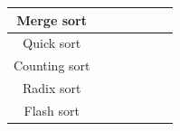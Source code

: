 \begin{table}[!h]
{\begin{tabular}{|c|c|c|c|c|c|c|}
    Merge sort                 &                 &               &                &               &               &                 \\ \hline
    Quick sort                 &                 &               &                &               &               &                 \\ \hline
    Counting sort              &                 &               &                &               &               &                 \\ \hline
    Radix sort                 &                 &               &                &               &               &                 \\ \hline
    Flash sort                 &                 &               &                &               &               &                 \\ \hline
    \end{tabular}}
    \end{table}

